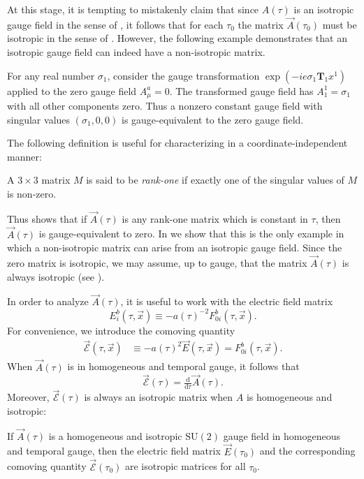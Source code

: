 At this stage, it is tempting to mistakenly claim that since $A(\tau)$ is an isotropic gauge field in the sense of , it follows that for each $\tau_{0}$ the matrix $\vec{A}(\tau_{0})$ must be isotropic in the sense of . However, the following example demonstrates that an isotropic gauge field can indeed have a non-isotropic matrix.
\begin{example}
\label{exa:local-gt}For any real number $\sigma_{1}$, consider the gauge transformation $\exp\left(-ie\sigma_{1}\mathbf{T}_{1}x^{1}\right)$ applied to the zero gauge field $A_{\mu}^{a}=0$. The transformed gauge field has $A_{1}^{1}=\sigma_{1}$ with all other components zero. Thus a nonzero constant gauge field with singular values $(\sigma_{1},0,0)$ is gauge-equivalent to the zero gauge field.
\end{example}

The following definition is useful for characterizing  in a coordinate-independent manner:
\begin{defn}
\label{def:rank-one}A $3\times3$ matrix $M$ is said to be \emph{rank-one} if exactly one of the singular values of $M$ is non-zero.
\end{defn}

Thus  shows that if $\vec{A}(\tau)$ is any rank-one matrix which is constant in $\tau$, then $\vec{A}(\tau)$ is gauge-equivalent to zero. In  we show that this is the only example in which a non-isotropic matrix can arise from an isotropic gauge field. Since the zero matrix is isotropic, we may assume, up to gauge, that the matrix $\vec{A}(\tau)$ is always isotropic (see ).

In order to analyze $\vec{A}(\tau)$, it is useful to work with the electric field matrix 
\[
E_{i}^{b}(\tau,\vec{x})\equiv-a(\tau)^{-2}F_{0i}^{b}(\tau,\vec{x}).
\]
For convenience, we introduce the comoving quantity 
\begin{align*}
\vec{\mathcal{E}}(\tau,\vec{x}) & \equiv-a(\tau)^{2}\vec{E}(\tau,\vec{x})=F_{0i}^{b}(\tau,\vec{x}).
\end{align*}
 When $\vec{A}(\tau)$ is in homogeneous and temporal gauge, it follows that 
\begin{equation}
\vec{\mathcal{E}}(\tau)=\tfrac{\mathrm{d}}{\mathrm{d}\tau}\vec{A}(\tau).\label{eq:E-is-derivative}
\end{equation}
 Moreover, $\vec{\mathcal{E}}(\tau)$ is always an isotropic matrix when $A$ is homogeneous and isotropic:
\begin{lem}
\label{lem:elec-is-iso}If $\vec{A}(\tau)$ is a homogeneous and isotropic $\mathrm{SU}(2)$ gauge field in homogeneous and temporal gauge, then the electric field matrix $\vec{E}(\tau_{0})$ and the corresponding comoving quantity $\vec{\mathcal{E}}(\tau_{0})$ are isotropic matrices for all $\tau_{0}$. 
\end{lem}

